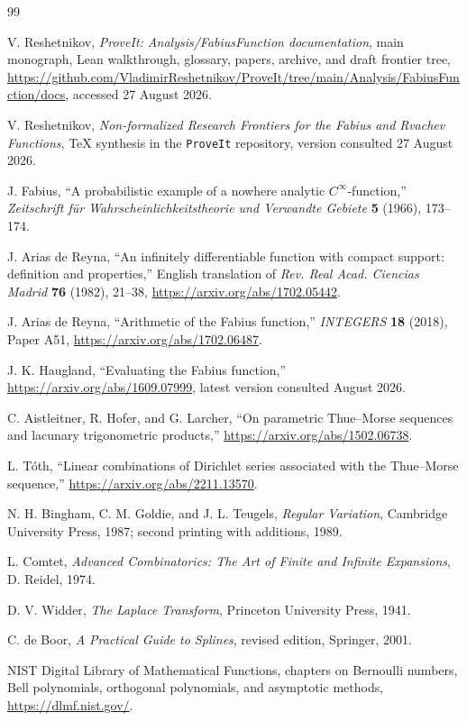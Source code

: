 \documentclass[11pt,oneside]{article}
\theoremstyle{definition}
\theoremstyle{remark}
\newcommand{\repo}{\texttt{ProveIt}}
\begin{document}
\begin{thebibliography}{99}

V. Reshetnikov,
\emph{ProveIt: Analysis/FabiusFunction documentation},
main monograph, Lean walkthrough, glossary, papers, archive, and draft frontier tree,
\url{https://github.com/VladimirReshetnikov/ProveIt/tree/main/Analysis/FabiusFunction/docs},
accessed 27 August 2026.

V. Reshetnikov,
\emph{Non-formalized Research Frontiers for the Fabius and Rvachev Functions},
TeX synthesis in the \repo{} repository, version consulted 27 August 2026.

J. Fabius,
``A probabilistic example of a nowhere analytic $C^\infty$-function,''
\emph{Zeitschrift f\"ur Wahrscheinlichkeitstheorie und Verwandte Gebiete}
\textbf{5} (1966), 173--174.

J. Arias de Reyna,
``An infinitely differentiable function with compact support: definition and properties,''
English translation of \emph{Rev. Real Acad. Ciencias Madrid} \textbf{76} (1982), 21--38,
\url{https://arxiv.org/abs/1702.05442}.

J. Arias de Reyna,
``Arithmetic of the Fabius function,''
\emph{INTEGERS} \textbf{18} (2018), Paper A51,
\url{https://arxiv.org/abs/1702.06487}.

J. K. Haugland,
``Evaluating the Fabius function,''
\url{https://arxiv.org/abs/1609.07999}, latest version consulted August 2026.

C. Aistleitner, R. Hofer, and G. Larcher,
``On parametric Thue--Morse sequences and lacunary trigonometric products,''
\url{https://arxiv.org/abs/1502.06738}.

L. T\'oth,
``Linear combinations of Dirichlet series associated with the Thue--Morse sequence,''
\url{https://arxiv.org/abs/2211.13570}.

N. H. Bingham, C. M. Goldie, and J. L. Teugels,
\emph{Regular Variation},
Cambridge University Press, 1987; second printing with additions, 1989.

L. Comtet,
\emph{Advanced Combinatorics: The Art of Finite and Infinite Expansions},
D. Reidel, 1974.

D. V. Widder,
\emph{The Laplace Transform},
Princeton University Press, 1941.

C. de Boor,
\emph{A Practical Guide to Splines}, revised edition,
Springer, 2001.

NIST Digital Library of Mathematical Functions,
chapters on Bernoulli numbers, Bell polynomials, orthogonal polynomials, and asymptotic methods,
\url{https://dlmf.nist.gov/}.

\end{thebibliography}
\end{document}
